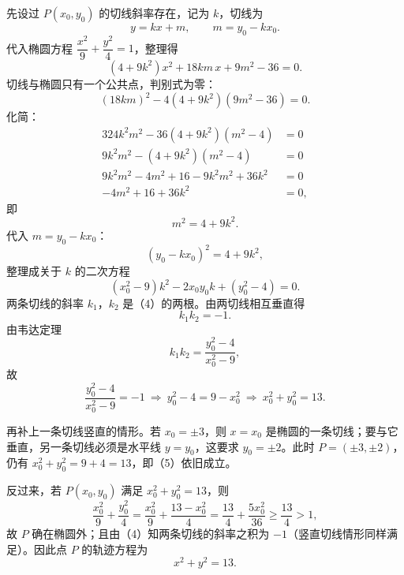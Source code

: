 \begin{answer}
先设过 $P(x_0,y_0)$ 的切线斜率存在，记为 $k$，切线为
\nopagebreak[4]
\[y=kx+m,\qquad m=y_0-kx_0.\]
代入椭圆方程 $\dfrac{x^2}{9}+\dfrac{y^2}{4}=1$，整理得
\nopagebreak[4]
\[(4+9k^2)x^2+18km\,x+9m^2-36=0.\]
切线与椭圆只有一个公共点，判别式为零：
\nopagebreak[4]
\[(18km)^2-4(4+9k^2)(9m^2-36)=0.\]
化简：
\nopagebreak[4]
\[\begin{aligned}
324k^2m^2-36(4+9k^2)(m^2-4)&=0\\
9k^2m^2-(4+9k^2)(m^2-4)&=0\\
9k^2m^2-4m^2+16-9k^2m^2+36k^2&=0\\
-4m^2+16+36k^2&=0,
\end{aligned}\]
即
\nopagebreak[4]
\[m^2=4+9k^2.\]
代入 $m=y_0-kx_0$：
\nopagebreak[4]
\[(y_0-kx_0)^2=4+9k^2,\]
整理成关于 $k$ 的二次方程
\nopagebreak[4]
\[(x_0^2-9)k^2-2x_0y_0k+(y_0^2-4)=0. \tag{4}\]
两条切线的斜率 $k_1$，$k_2$ 是（4）的两根。由两切线相互垂直得
\nopagebreak[4]
\[k_1k_2=-1.\]
由韦达定理
\nopagebreak[4]
\[k_1k_2=\frac{y_0^2-4}{x_0^2-9},\]
故
\nopagebreak[4]
\[\frac{y_0^2-4}{x_0^2-9}=-1
\ \Longrightarrow\ y_0^2-4=9-x_0^2
\ \Longrightarrow\ x_0^2+y_0^2=13. \tag{5}\]

再补上一条切线竖直的情形。若 $x_0=\pm3$，则 $x=x_0$ 是椭圆的一条切线；要与它垂直，另一条切线必须是水平线 $y=y_0$，这要求 $y_0=\pm2$。此时 $P=(\pm3,\pm2)$，仍有 $x_0^2+y_0^2=9+4=13$，即（5）依旧成立。

反过来，若 $P(x_0,y_0)$ 满足 $x_0^2+y_0^2=13$，则
\nopagebreak[4]
\[\frac{x_0^2}{9}+\frac{y_0^2}{4}
=\frac{x_0^2}{9}+\frac{13-x_0^2}{4}
=\frac{13}{4}+\frac{5x_0^2}{36}\geqslant\frac{13}{4}>1,\]
故 $P$ 确在椭圆外；且由（4）知两条切线的斜率之积为 $-1$（竖直切线情形同样满足）。因此点 $P$ 的轨迹方程为
\nopagebreak[4]
\[x^2+y^2=13.\]



\end{answer}
